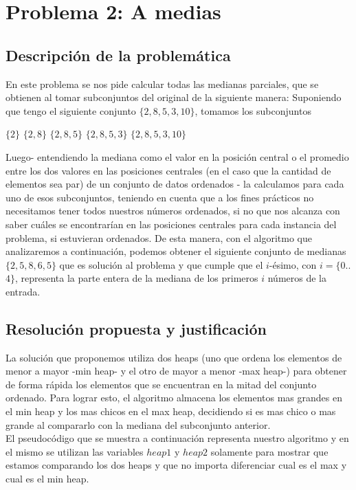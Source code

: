 \section{Problema 2: A medias}

\subsection{Descripción de la problemática}
En este problema se nos pide calcular todas las medianas parciales, que se obtienen al tomar subconjuntos del original de la siguiente manera:
Suponiendo que tengo el siguiente conjunto $\{2,8,5,3,10\}$, tomamos los subconjuntos
\begin{center}
	$\{2\}$ $\{2,8\}$ $\{2,8,5\}$ $\{2,8,5,3\}$ $\{2,8,5,3,10\}$
\end{center}
Luego- entendiendo la mediana como el valor en la posición central o el promedio entre los dos valores en las posiciones centrales (en el caso que la cantidad de elementos sea par) de un conjunto de datos ordenados - la calculamos para cada uno de esos subconjuntos, teniendo en cuenta que a los fines prácticos no necesitamos tener todos nuestros números ordenados, si no que nos alcanza con saber cuáles se encontrarían en las posiciones centrales para cada instancia del problema, si estuvieran ordenados. De esta manera, con el algoritmo que analizaremos a continuación, podemos obtener el siguiente conjunto de medianas $\{2,5,8,6,5\}$ que es solución al problema y que cumple que el $i$-ésimo, con $i = \{0 $..$ 4\}$, representa la parte entera de la mediana de los primeros $i$ números de la entrada. 

\subsection{Resolución propuesta y justificación}

La solución que proponemos utiliza dos heaps (uno que ordena los elementos de menor a mayor -min heap- y el otro de mayor a menor -max heap-) para obtener de forma rápida los elementos que se encuentran en la mitad del conjunto ordenado. Para lograr esto, el algoritmo almacena los elementos mas grandes en el min heap y los mas chicos en el max heap, decidiendo si es mas chico o mas grande al compararlo con la mediana del subconjunto anterior.\\

El pseudocódigo que se muestra a continuación representa nuestro algoritmo y en el mismo se utilizan las variables $heap1$ y $heap2$ solamente para mostrar que estamos comparando los dos heaps y que no importa diferenciar cual es el max y cual es el min heap.\\

